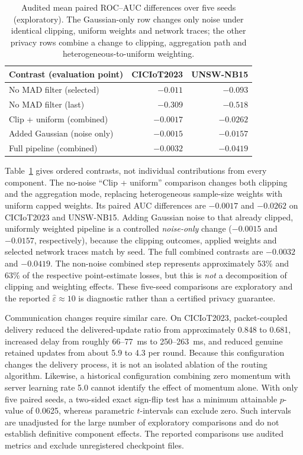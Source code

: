 \documentclass[5p,times,numafflabel]{elsarticle}
\begin{document}
\begin{table}[!tbp]
	\caption{Audited mean paired ROC--AUC differences over five seeds
		(exploratory). The Gaussian-only row changes only noise under
		identical clipping, uniform weights and network traces; the other
		privacy rows combine a change to clipping, aggregation path and
		heterogeneous-to-uniform weighting.}
	\label{tab:ablation-summary}
	\centering
	\footnotesize
	\setlength{\tabcolsep}{3pt}
	\renewcommand{\arraystretch}{1.02}
	\begin{tabular}{@{}lrr@{}}
		\toprule
		Contrast (evaluation point) & CICIoT2023 & UNSW-NB15 \\
		\midrule
		No MAD filter (selected) & $-0.011$ & $-0.093$ \\
		No MAD filter (last) & $-0.309$ & $-0.518$ \\
		Clip + uniform (combined) & $-0.0017$ & $-0.0262$ \\
		Added Gaussian (noise only) & $-0.0015$ & $-0.0157$ \\
		Full pipeline (combined) & $-0.0032$ & $-0.0419$ \\
		\bottomrule
	\end{tabular}
\end{table}

Table~\ref{tab:ablation-summary} gives ordered contrasts, not
individual contributions from every component. The no-noise
``Clip + uniform'' comparison changes both clipping and the
aggregation mode, replacing heterogeneous sample-size weights
with uniform capped weights. Its paired AUC differences are
$-0.0017$ and $-0.0262$ on CICIoT2023 and UNSW-NB15.
Adding Gaussian noise to that already clipped, uniformly weighted
pipeline is a controlled \emph{noise-only} change ($-0.0015$
and $-0.0157$, respectively), because the clipping outcomes,
applied weights and selected network traces match by seed.
The full combined contrasts are $-0.0032$ and $-0.0419$.
The non-noise combined step represents approximately 53\% and
63\% of the respective point-estimate losses, but this is
\emph{not} a decomposition of clipping and weighting effects.
These five-seed comparisons are exploratory and the reported
$\widehat\varepsilon\approx10$ is diagnostic rather than a
certified privacy guarantee.



Communication changes require similar care. On CICIoT2023,
packet-coupled delivery reduced the delivered-update ratio from
approximately 0.848 to 0.681, increased delay from roughly
66--77~ms to 250--263~ms, and reduced genuine retained updates
from about 5.9 to 4.3 per round. Because this configuration changes
the delivery process, it is not an isolated ablation of the routing
algorithm. Likewise, a historical configuration combining zero
momentum with server learning rate 5.0 cannot identify the effect
of momentum alone. With only five paired seeds, a two-sided exact
sign-flip test has a minimum attainable $p$-value of 0.0625,
whereas parametric $t$-intervals can exclude zero. Such intervals
are unadjusted for the large number of exploratory comparisons
and do not establish definitive component effects. The
reported comparisons use audited metrics and exclude unregistered
checkpoint files.
\end{document}
